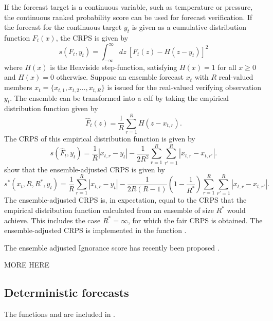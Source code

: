 \documentclass[article]{jss}
\begin{document}
If the forecast target is a continuous variable, such as temperature or pressure, the continuous ranked probability score \citep{matheson1976scoring} can be used for forecast verification.
If the forecast for the continuous target $y_t$ is given as a cumulative distribution function $F_t(x)$, the CRPS is given by 
%
\begin{equation}
s(F_t, y_t) = \int_{-\infty}^\infty dz\ \left[F_t(z) - H(z-y_t)\right]^2
\end{equation}
%
where $H(x)$ is the Heaviside step-function, satisfying $H(x)=1$ for all $x\ge 0$ and $H(x)=0$ otherwise.
Suppose an ensemble forecast $x_t$ with $R$ real-valued members $x_t = \{x_{t,1}, x_{t,2} \dots, x_{t,R}\}$ is issued for the real-valued verifying observation $y_t$.
The ensemble can be transformed into a cdf by taking the empirical distribution function given by 
%
\begin{equation}
\hat{F}_t(z) = \frac{1}{R} \sum_{r=1}^{R} H(z - x_{t,r}).
\end{equation}
%
The CRPS of this empirical distribution function is given by
%
\begin{equation}
s(\hat{F}_t, y_t) = \frac{1}{R}|x_{t,r}-y_t| - \frac{1}{2R^2} \sum_{r=1}^R \sum_{r'=1}^R |x_{t,r}-x_{t,r'}|.
\end{equation}
%
\citet{fricker2013three} show that the ensemble-adjusted CRPS is given by
%
\begin{equation}
s^*(x_t, R, R^*, y_t) = \frac{1}{R}\sum_{r=1}^R |x_{t,r} - y_t| - \frac{1}{2R(R-1)}\left(1-\frac{1}{R^*}\right) \sum_{r=1}^R\sum_{r'=1}^R |x_{t,r}-x_{t,r'}|.
\end{equation}
%
The ensemble-adjusted CRPS is, in expectation, equal to the CRPS that the empirical distribution function calculated from an ensemble of size $R^*$ would achieve.
This includes the case $R^*=\infty$, for which the fair CRPS is obtained.
The ensemble-adjusted CRPS is implemented in the  function .



The ensemble adjusted Ignorance score has recently been proposed \citep{siegert2015ignorance}.

MORE HERE


\subsection{Deterministic forecasts}


The functions  and  are included in .
\end{document}
